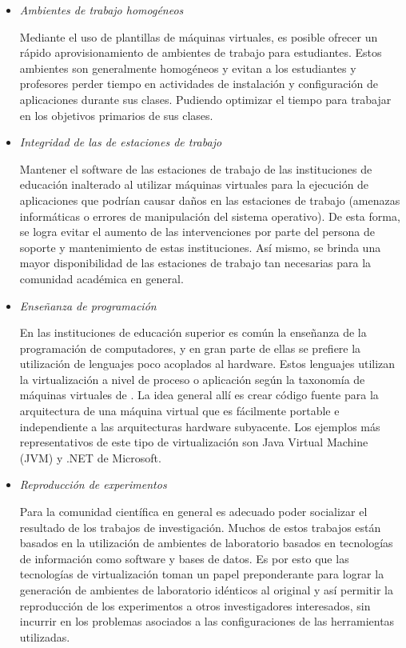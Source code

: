 \begin{itemize}
	\item \textit{Ambientes de trabajo homogéneos} \vspace{3mm}
	
	Mediante el uso de plantillas de máquinas virtuales, es posible ofrecer un rápido aprovisionamiento de ambientes de trabajo para estudiantes. Estos ambientes son generalmente homogéneos y evitan a los estudiantes y profesores perder tiempo en actividades de instalación y configuración de aplicaciones durante sus clases. Pudiendo optimizar el tiempo para trabajar en los objetivos primarios de sus clases.\\
	
	\item \textit{Integridad de las de estaciones de trabajo}\vspace{3mm} 
	
	Mantener el software de las estaciones de trabajo de las instituciones de educación inalterado al utilizar máquinas virtuales para la ejecución de aplicaciones que podrían causar daños en las estaciones de trabajo (amenazas informáticas o errores de manipulación del sistema operativo). De esta forma, se logra evitar el aumento de las intervenciones por parte del persona de soporte y mantenimiento de estas instituciones. Así mismo, se brinda una mayor disponibilidad de las estaciones de trabajo tan necesarias para la comunidad académica en general. \\
	
	\item \textit{Enseñanza de programación} \vspace{3mm} 
	
	En las instituciones de educación superior es común la enseñanza de la programación de computadores, y en gran parte de ellas se prefiere la utilización de lenguajes poco acoplados al hardware. Estos lenguajes utilizan la virtualización a nivel de proceso o aplicación según la taxonomía de máquinas virtuales de  \textcite{Pessolani2012}. La idea general allí es crear código fuente para la arquitectura de una máquina virtual que es fácilmente portable e independiente a las arquitecturas hardware subyacente. Los ejemplos más representativos de este tipo de virtualización son Java Virtual Machine (JVM) y .NET de Microsoft. \\

	\item \textit{Reproducción de experimentos}\vspace{3mm}
	
	Para la comunidad científica en general es adecuado poder socializar el resultado de los trabajos de investigación. Muchos de estos trabajos están basados en la utilización de ambientes de laboratorio basados en tecnologías de información como software y bases de datos. Es por esto que las tecnologías de virtualización toman un papel preponderante para lograr la generación de ambientes de laboratorio idénticos al original y así permitir la reproducción de los experimentos a otros investigadores interesados, sin incurrir en los problemas asociados a las configuraciones de las herramientas utilizadas.
	
\end{itemize}

